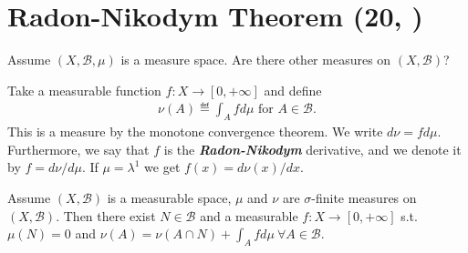 \section{Radon-Nikodym Theorem \tiny{(20, \cite{schilling2017measures})}}
Assume \((X,\mathscr{B}, \mu)\) is a measure space. Are there other measures on \((X,\mathscr{B})\)?
\begin{example}
    Take a measurable function \(f:X\rightarrow [0,+\infty]\) and define
    \begin{align*}
        \nu(A) \eqdef \int_A fd\mu \text{ for } A\in\mathscr{B}.
    \end{align*}
    This is a measure by the monotone convergence theorem. We write \(d\nu = fd\mu\). Furthermore, we say that \(f\) is the 
    \textbf{\emph{Radon-Nikodym}} derivative, and we denote it by \(f = d\nu/d\mu\). If \(\mu=\lambda^1\) we get
    \(f(x) = d\nu(x)/dx\).
\end{example}
\begin{proposition}
    Assume \((X,\mathscr{B})\) is a measurable space, \(\mu\) and \(\nu\) are \(\sigma\)-finite measures on \((X,\mathscr{B})\). Then there
    exist \(N\in\mathscr{B}\) and a measurable \(f:X\rightarrow[0,+\infty]\) s.t.
    \(\mu(N)=0\) and \(\nu(A)=\nu(A\cap N) + \int_A fd\mu \ \forall A\in\mathscr{B}\). 
\end{proposition}
\ifdetailed 
